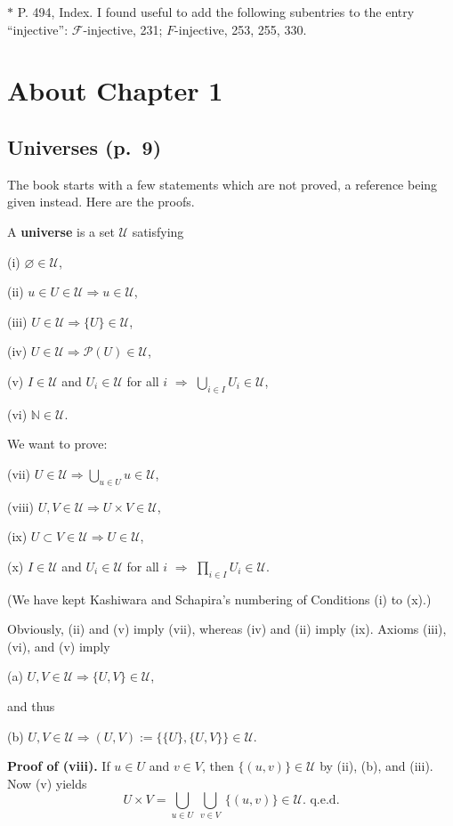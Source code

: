 \documentclass[12pt]{article}%
\theoremstyle{remark}
\theoremstyle{definition}
\newcommand{\cc}{\mathcal}
\newcommand{\then}{\Rightarrow}
\begin{document}
\noindent $*$ P. 494, Index. I found useful to add the following subentries to the entry ``injective'': $\cc F$-injective, 231; $F$-injective, 253, 255, 330.


\section{About Chapter 1}

\subsection{Universes (p.~9)}

The book starts with a few statements which are not proved, a reference being given instead. Here are the proofs.

A \textbf{universe} is a set $\mathcal U$ satisfying 

(i) $\varnothing\in\mathcal U$,

(ii) $u\in U\in\mathcal U\then u\in \mathcal U$,

(iii) $U\in\mathcal U\then\{U\}\in\mathcal U$,

(iv) $U\in\mathcal U\then\mathcal P(U)\in\mathcal U$,

(v) $I\in\mathcal U$ and $U_i\in\mathcal U$ for all $i$ $\then$ $\bigcup_{i\in I}U_i\in\mathcal U$,

(vi) $\mathbb N\in\mathcal U$.

\noindent We want to prove:

(vii) $U\in\mathcal U\then\bigcup_{u\in U}u\in\mathcal U$,

(viii) $U,V\in\mathcal U\then U\times V\in\mathcal U$,

(ix) $U\subset V\in\mathcal U\then U\in\mathcal U$,

(x) $I\in \mathcal U$ and $U_i\in\mathcal U$ for all $i$ $\then$ $\prod_{i\in I}U_i\in\mathcal U$.

\noindent(We have kept Kashiwara and Schapira's numbering of Conditions (i) to (x).) 

\noindent Obviously, (ii) and (v) imply (vii), whereas (iv) and (ii) imply (ix). Axioms (iii), (vi), and (v) imply

(a) $U,V\in\mathcal U\then\{U,V\}\in\mathcal U$,

\noindent and thus

(b) $U,V\in\mathcal U\then(U,V):=\{\{U\},\{U,V\}\}\in\mathcal U$.

\noindent\textbf{Proof of (viii).} If $u\in U$ and $v\in V$, then $\{(u,v)\}\in\mathcal U$ by (ii), (b), and (iii). Now (v) yields 
$$
U\times V=\bigcup_{u\in U}\ \bigcup_{v\in V}\ \{(u,v)\}\in\mathcal U.\text{ q.e.d.} 
$$ 
\end{document}
